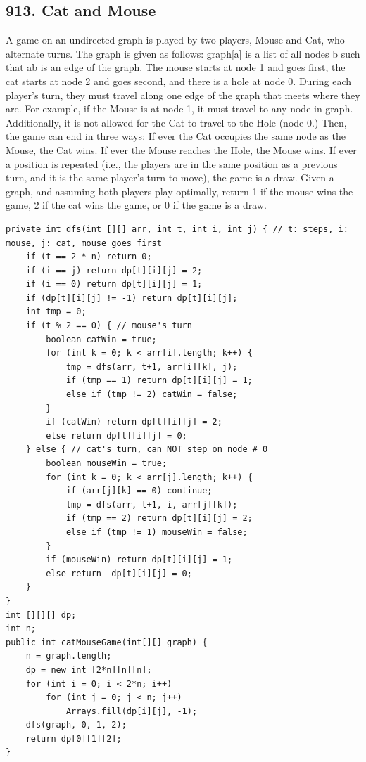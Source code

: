 \documentclass[9pt, b5paper]{article}
\begin{document}
\subsection{913. Cat and Mouse}
\label{sec-4-8}
A game on an undirected graph is played by two players, Mouse and Cat, who alternate turns.
The graph is given as follows: graph[a] is a list of all nodes b such that ab is an edge of the graph.
The mouse starts at node 1 and goes first, the cat starts at node 2 and goes second, and there is a hole at node 0.
During each player's turn, they must travel along one edge of the graph that meets where they are.  For example, if the Mouse is at node 1, it must travel to any node in graph\footnotemark[4]{}.
Additionally, it is not allowed for the Cat to travel to the Hole (node 0.)
Then, the game can end in three ways:
If ever the Cat occupies the same node as the Mouse, the Cat wins.
If ever the Mouse reaches the Hole, the Mouse wins.
If ever a position is repeated (i.e., the players are in the same position as a previous turn, and it is the same player's turn to move), the game is a draw.
Given a graph, and assuming both players play optimally, return
1 if the mouse wins the game,
2 if the cat wins the game, or
0 if the game is a draw.
\begin{verbatim}
private int dfs(int [][] arr, int t, int i, int j) { // t: steps, i: mouse, j: cat, mouse goes first
    if (t == 2 * n) return 0;
    if (i == j) return dp[t][i][j] = 2;
    if (i == 0) return dp[t][i][j] = 1;
    if (dp[t][i][j] != -1) return dp[t][i][j];
    int tmp = 0;
    if (t % 2 == 0) { // mouse's turn
        boolean catWin = true;
        for (int k = 0; k < arr[i].length; k++) {
            tmp = dfs(arr, t+1, arr[i][k], j);
            if (tmp == 1) return dp[t][i][j] = 1;
            else if (tmp != 2) catWin = false;
        }
        if (catWin) return dp[t][i][j] = 2;
        else return dp[t][i][j] = 0;
    } else { // cat's turn, can NOT step on node # 0
        boolean mouseWin = true;
        for (int k = 0; k < arr[j].length; k++) {
            if (arr[j][k] == 0) continue;
            tmp = dfs(arr, t+1, i, arr[j][k]);
            if (tmp == 2) return dp[t][i][j] = 2;
            else if (tmp != 1) mouseWin = false;
        }
        if (mouseWin) return dp[t][i][j] = 1;
        else return  dp[t][i][j] = 0;
    }
}
int [][][] dp;
int n;
public int catMouseGame(int[][] graph) {
    n = graph.length;
    dp = new int [2*n][n][n];
    for (int i = 0; i < 2*n; i++) 
        for (int j = 0; j < n; j++)
            Arrays.fill(dp[i][j], -1);
    dfs(graph, 0, 1, 2);
    return dp[0][1][2];
}
\end{verbatim}
\end{document}
